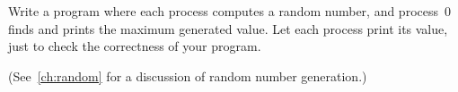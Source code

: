   \label{ex:randommax}
  Write a program where each process computes a random number, and process~0
  finds and prints the maximum generated value. Let each process print its value,
  just to check the correctness of your program.
\begin{book}
  (See~\ref{ch:random} for a discussion of random number generation.)
\end{book}
